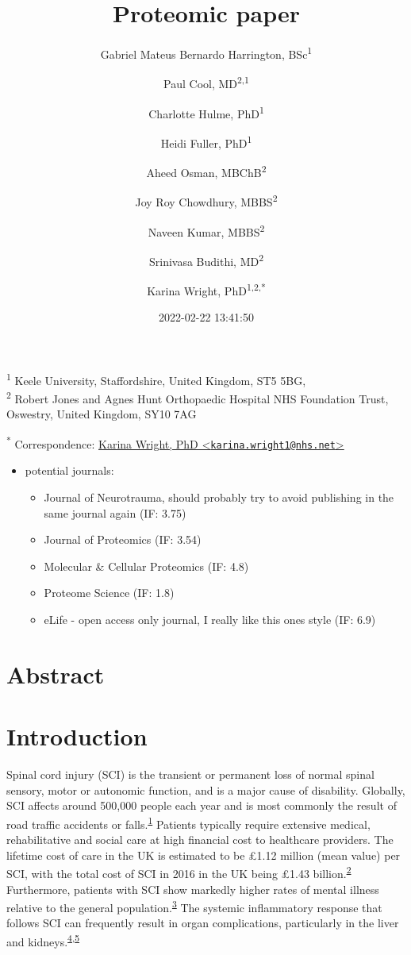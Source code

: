 \documentclass[
]{article}
\title{Proteomic paper}
\author{Gabriel Mateus Bernardo Harrington, BSc\textsuperscript{1} \and Paul Cool, MD\textsuperscript{2,1} \and Charlotte Hulme, PhD\textsuperscript{1} \and Heidi Fuller, PhD\textsuperscript{1} \and Aheed Osman, MBChB\textsuperscript{2} \and Joy Roy Chowdhury, MBBS\textsuperscript{2} \and Naveen Kumar, MBBS\textsuperscript{2} \and Srinivasa Budithi, MD\textsuperscript{2} \and Karina Wright, PhD\textsuperscript{1,2,*}}
\date{2022-02-22 13:41:50}
\providecommand{\tightlist}{%
  \setlength{\itemsep}{0pt}\setlength{\parskip}{0pt}}
\begin{document}
\maketitle

\textsuperscript{1} Keele University, Staffordshire, United Kingdom, ST5 5BG,\\
\textsuperscript{2} Robert Jones and Agnes Hunt Orthopaedic Hospital NHS Foundation Trust, Oswestry, United Kingdom, SY10 7AG

\textsuperscript{*} Correspondence: \href{mailto:karina.wright1@nhs.net}{Karina Wright, PhD \textless{}\href{mailto:karina.wright1@nhs.net}{\nolinkurl{karina.wright1@nhs.net}}\textgreater{}}

\begin{itemize}
\tightlist
\item
  potential journals:

  \begin{itemize}
  \tightlist
  \item
    Journal of Neurotrauma, should probably try to avoid publishing in the same journal again (IF: 3.75)
  \item
    Journal of Proteomics (IF: 3.54)
  \item
    Molecular \& Cellular Proteomics (IF: 4.8)
  \item
    Proteome Science (IF: 1.8)
  \item
    eLife - open access only journal, I really like this ones style (IF: 6.9)
  \end{itemize}
\end{itemize}

\hypertarget{abstract}{%
\section{Abstract}\label{abstract}}

\hypertarget{introduction}{%
\section{Introduction}\label{introduction}}

Spinal cord injury (SCI) is the transient or permanent loss of normal spinal sensory, motor or autonomic function, and is a major cause of disability.
Globally, SCI affects around 500,000 people each year and is most commonly the result of road traffic accidents or falls.\textsuperscript{\protect\hyperlink{ref-crozier-shaw_management_2020}{1}}
Patients typically require extensive medical, rehabilitative and social care at high financial cost to healthcare providers.
The lifetime cost of care in the UK is estimated to be £1.12 million (mean value) per SCI, with the total cost of SCI in 2016 in the UK being £1.43 billion.\textsuperscript{\protect\hyperlink{ref-mcdaid_understanding_2019}{2}}
Furthermore, patients with SCI show markedly higher rates of mental illness relative to the general population.\textsuperscript{\protect\hyperlink{ref-furlan_health_2017}{3}}
The systemic inflammatory response that follows SCI can frequently result in organ complications, particularly in the liver and kidneys.\textsuperscript{\protect\hyperlink{ref-gris_systemic_2008}{4},\protect\hyperlink{ref-sun_multiple_2016}{5}}
\end{document}
